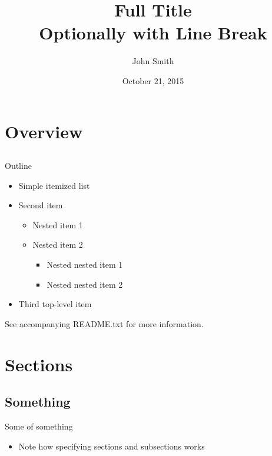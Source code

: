 \documentclass[aspectratio=169]{beamer}
\author[J.~Smith]{John Smith}
\date[2015-10-21]{October 21, 2015}
\title[Short Title]{\Huge Full Title \\ Optionally with Line Break}
\institute{Michigan State University}
\begin{document}
\begin{frame}
  \maketitle
\end{frame}

\section{Overview}
\subsection{}

\begin{frame}
  {Outline}
  \begin{itemize}
    \item Simple itemized list
    \item Second item
      \begin{itemize}
        \item Nested item 1
        \item Nested item 2
          \begin{itemize}
            \item Nested nested item 1
            \item Nested nested item 2
          \end{itemize}
      \end{itemize}
    \item Third top-level item
  \end{itemize}
  \vspace{1em}
  See accompanying README.txt for more information.
\end{frame}

\section{Sections}
\subsection{Something}

\begin{frame}
  {Some of something}
  \begin{itemize}
    \item Note how specifying sections and subsections works
  \end{itemize}
\end{frame}
\end{document}
